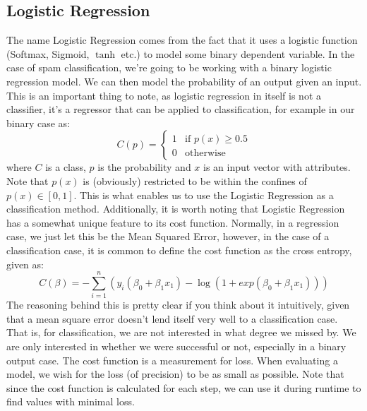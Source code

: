 \documentclass{article}
\begin{document}
\subsection{Logistic Regression}
The name Logistic Regression comes from the fact that it uses a logistic function (Softmax, Sigmoid, $\tanh$ etc.) to model some binary dependent variable. In the case of spam classification, we're going to be working with a binary logistic regression model. We can then model the probability of an output given an input. This is an important thing to note, as logistic regression in itself is not a classifier, it's a regressor that can be applied to classification, for example in our binary case as:
\begin{equation}
    C(p) = \begin{cases}
                                   1 & \text{if $p(x)\geq 0.5$} \\
                                   0 & \text{otherwise}
  \end{cases}
\end{equation}
where $C$ is a class, $p$ is the probability and $x$ is an input vector with attributes. Note that $p(x)$ is (obviously) restricted to be within the confines of $p(x) \in [0,1]$. \newline
This is what enables us to use the Logistic Regression as a classification method. \newpage
Additionally, it is worth noting that Logistic Regression has a somewhat unique feature to its cost function. Normally, in a regression case, we just let this be the Mean Squared Error, however, in the case of a classification case, it is common to define the cost function as the cross entropy, given as:
\begin{equation*}
    C(\beta) = - \sum_{i=1}^n (y_i(\beta_0 + \beta_1 x_1) - \log (1+ exp(\beta_0 + \beta_1 x_1)))
\end{equation*}
The reasoning behind this is pretty clear if you think about it intuitively, given that a mean square error doesn't lend itself very well to a classification case. That is, for classification, we are not interested in what degree we missed by. We are only interested in whether we were successful or not, especially in a binary output case.\newline
The cost function is a measurement for loss. When evaluating a model, we wish for the loss (of precision) to be as small as possible. Note that since the cost function is calculated for each step, we can use it during runtime to find values with minimal loss.
\end{document}
